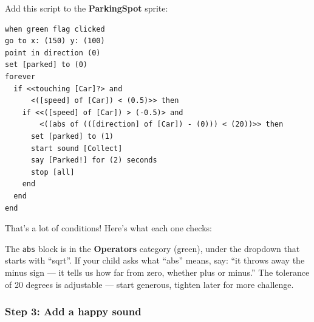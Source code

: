 \documentclass[11pt,a4paper]{article}
\begin{document}
Add this script to the \textbf{ParkingSpot} sprite:

\begin{scratchblockbox}
\begin{lstlisting}[style=scratch]
when green flag clicked
go to x: (150) y: (100)
point in direction (0)
set [parked] to (0)
forever
  if <<touching [Car]?> and
      <([speed] of [Car]) < (0.5)>> then
    if <<([speed] of [Car]) > (-0.5)> and
        <((abs of (([direction] of [Car]) - (0))) < (20))>> then
      set [parked] to (1)
      start sound [Collect]
      say [Parked!] for (2) seconds
      stop [all]
    end
  end
end
\end{lstlisting}
\end{scratchblockbox}

That's a lot of conditions! Here's what each one checks:

\begin{center}
\end{center}

\begin{parentbox}
The \texttt{abs} block is in the \textbf{Operators} category (green), under the dropdown that starts with ``sqrt''. If your child asks what ``abs'' means, say: ``it throws away the minus sign --- it tells us how far from zero, whether plus or minus.'' The tolerance of 20 degrees is adjustable --- start generous, tighten later for more challenge.
\end{parentbox}

\subsubsection{Step 3: Add a happy sound}
\end{document}
